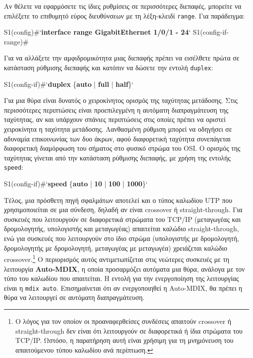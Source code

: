 \documentclass{EdipyLabs} %
\begin{document}
Αν θέλετε να εφαρμόσετε τις ίδιες ρυθμίσεις σε περισσότερες διεπαφές, μπορείτε να επιλέξετε το επιθυμητό εύρος διευθύνσεων με τη λέξη-κλειδί \texttt{range}. Για παράδειγμα:

\begin{CommandBox}
S1(config)#`\textbf{interface range GigabitEthernet 1/0/1 - 24}`
S1(config-if-range)# 
\end{CommandBox}

Για να αλλάξετε την αμφιδρομικότητα μιας διεπαφής πρέπει να εισέλθετε πρώτα σε κατάσταση ρύθμισης διεπαφής και κατόπιν να δώσετε την εντολή \texttt{duplex}:

\begin{CommandBox}
S1(config-if)#`\textbf{duplex} \{\textbf{auto} | \textbf{full} | \textbf{half}\}`
\end{CommandBox}

Για μια θύρα είναι δυνατός ο χειροκίνητος ορισμός της ταχύτητας μετάδοσης. Στις περισσότερες περιπτώσεις είναι προεπιλεγμένη η αυτόματη διαπραγμάτευση της ταχύτητας, αν και υπάρχουν σπάνιες περιπτώσεις στις οποίες πρέπει να οριστεί χειροκίνητα η ταχύτητα μετάδοσης. Λανθασμένη ρύθμιση μπορεί να οδηγήσει σε αδυναμία επικοινωνίας των δυο άκρων, αφού διαφορετική ταχύτητα συνεπάγεται διαφορετική διαμόρφωση του σήματος στο φυσικό στρώμα του OSI. Ο ορισμός της ταχύτητας γίνεται από την κατάσταση ρύθμισης διεπαφής, με χρήση της εντολής \texttt{speed}: 

\begin{CommandBox}
S1(config-if)#`\textbf{speed} \{\textbf{auto} | \textbf{10} | \textbf{100} | \textbf{1000}\}`
\end{CommandBox}

Τέλος, μια πρόσθετη πηγή σφαλμάτων αποτελεί και ο τύπος καλωδίου UTP που χρησιμοποιείται σε μια σύνδεση, δηλαδή αν είναι crossover ή straight-through. Για συσκευές που λειτουργούν σε διαφορετικά στρώματα του TCP/IP (μεταγωγέας και δρομολογητής, υπολογιστής και μεταγωγέας) απαιτείται καλώδιο straight-through, ενώ για συσκευές που λειτουργούν στο ίδιο στρώμα (υπολογιστής με δρομολογητή, δρομολογητής με δρομολογητή, μεταγωγέας με μεταγωγέα) χρειάζεται καλώδιο crossover.\footnote{Ο λόγος για τον οποίον οι προαναφερθείσες συνδέσεις απαιτούν crossover ή straight-through δεν είναι ότι λειτουργούν σε διαφορετικά ή ίδια στρώματα του TCP/IP. Ωστόσο, η παρατήρηση αυτή είναι χρήσιμη για τη μνημόνευση του απαιτούμενου τύπου καλωδίου ανά περίπτωση.} Ο περιορισμός αυτός αντιμετωπίζεται στις νεώτερες συσκευές με τη λειτουργία \textbf{Auto-MDIX}, η οποία προσαρμόζει αυτόματα μια θύρα, ανάλογα με τον τύπο του καλωδίου που απαιτείται. Η εντολή για την ενεργοποίηση της λειτουργίας είναι η \texttt{mdix auto}. Επισημαίνεται ότι αν ενεργοποιηθεί η Auto-MDIX, θα πρέπει η θύρα να λειτουργεί σε αυτόματη διαπραγμάτευση.
\end{document}
